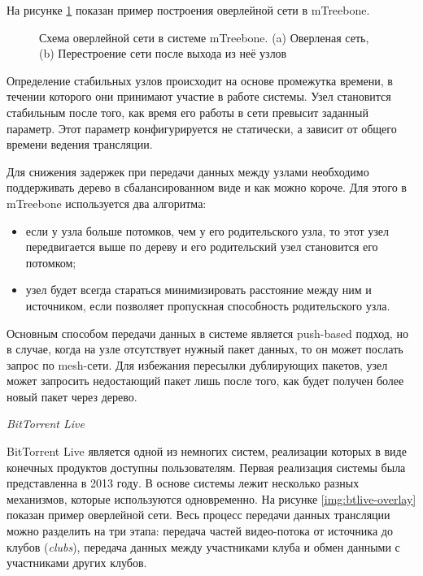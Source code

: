 		На рисунке \ref{img:mtreebone-overlay} показан пример построения оверлейной сети в mTreebone.
		\begin{figure}[h]
			\caption{Схема оверлейной сети в системе mTreebone. (a) Оверленая сеть, (b) Перестроение сети после
			выхода из неё узлов}
			\label{img:mtreebone-overlay}
		\end{figure}

		Определение стабильных узлов происходит на основе промежутка времени, в течении которого они принимают участие в
		работе системы. Узел становится стабильным после того, как время его работы в сети превысит заданный параметр.
		Этот параметр конфигурируется не статически, а зависит от общего времени ведения трансляции.

		Для снижения задержек при передачи данных между узлами необходимо поддерживать дерево в сбалансированном виде и
		как можно короче. Для этого в mTreebone используется два алгоритма:
		\begin{itemize}
			\item если у узла больше потомков, чем у его родительского узла, то этот узел передвигается выше по дереву и
			его родительский узел становится его потомком;
			\item узел будет всегда стараться минимизировать расстояние между ним и источником, если позволяет
			пропускная способность родительского узла.
		\end{itemize}

		Основным способом передачи данных в системе является push-based подход, но в случае, когда на узле отсутствует
		нужный пакет данных, то он может послать запрос по mesh-сети. Для избежания пересылки дублирующих пакетов, узел
		может запросить недостающий пакет лишь после того, как будет получен более новый пакет через дерево.

		\textit{BitTorrent Live}

		BitTorrent Live является одной из немногих систем, реализации которых в виде конечных продуктов доступны
		пользователям. Первая реализация системы была представленна в 2013 году. В основе системы лежит несколько разных
		механизмов, которые используются одновременно. На рисунке \ref{img:btlive-overlay} показан пример оверлейной
		сети. Весь процесс передачи данных трансляции можно разделить на три этапа: передача частей видео-потока от
		источника до клубов (\textit{clubs}), передача данных между участниками клуба и обмен данными с участниками
		других клубов.

